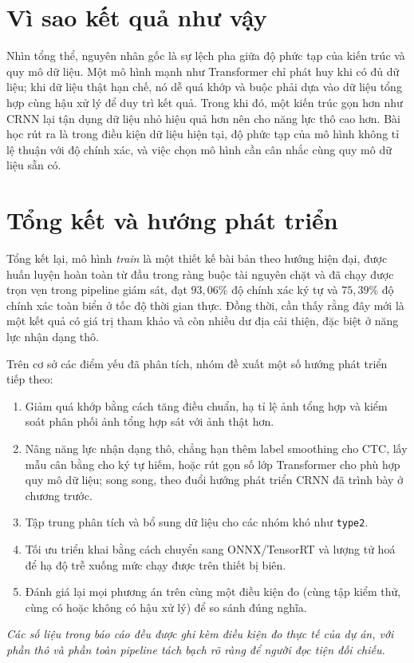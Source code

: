 \documentclass[12pt,a4paper]{report}
\begin{document}
\section{Vì sao kết quả như vậy}
Nhìn tổng thể, nguyên nhân gốc là sự lệch pha giữa độ phức tạp của kiến trúc và quy mô dữ liệu. Một mô hình mạnh như Transformer chỉ phát huy khi có đủ dữ liệu; khi dữ liệu thật hạn chế, nó dễ quá khớp và buộc phải dựa vào dữ liệu tổng hợp cùng hậu xử lý để duy trì kết quả. Trong khi đó, một kiến trúc gọn hơn như CRNN lại tận dụng dữ liệu nhỏ hiệu quả hơn nên cho năng lực thô cao hơn. Bài học rút ra là trong điều kiện dữ liệu hiện tại, độ phức tạp của mô hình không tỉ lệ thuận với độ chính xác, và việc chọn mô hình cần cân nhắc cùng quy mô dữ liệu sẵn có.

\section{Tổng kết và hướng phát triển}
Tổng kết lại, mô hình \emph{train} là một thiết kế bài bản theo hướng hiện đại, được huấn luyện hoàn toàn từ đầu trong ràng buộc tài nguyên chặt và đã chạy được trọn vẹn trong pipeline giám sát, đạt $93{,}06\%$ độ chính xác ký tự và $75{,}39\%$ độ chính xác toàn biển ở tốc độ thời gian thực. Đồng thời, cần thấy rằng đây mới là một kết quả có giá trị tham khảo và còn nhiều dư địa cải thiện, đặc biệt ở năng lực nhận dạng thô.

Trên cơ sở các điểm yếu đã phân tích, nhóm đề xuất một số hướng phát triển tiếp theo:
\begin{enumerate}[leftmargin=*]
  \item Giảm quá khớp bằng cách tăng điều chuẩn, hạ tỉ lệ ảnh tổng hợp và kiểm soát phân phối ảnh tổng hợp sát với ảnh thật hơn.
  \item Nâng năng lực nhận dạng thô, chẳng hạn thêm label smoothing cho CTC, lấy mẫu cân bằng cho ký tự hiếm, hoặc rút gọn số lớp Transformer cho phù hợp quy mô dữ liệu; song song, theo đuổi hướng phát triển CRNN đã trình bày ở chương trước.
  \item Tập trung phân tích và bổ sung dữ liệu cho các nhóm khó như \texttt{type2}.
  \item Tối ưu triển khai bằng cách chuyển sang ONNX/TensorRT và lượng tử hoá để hạ độ trễ xuống mức chạy được trên thiết bị biên.
  \item Đánh giá lại mọi phương án trên cùng một điều kiện đo (cùng tập kiểm thử, cùng có hoặc không có hậu xử lý) để so sánh đúng nghĩa.
\end{enumerate}

\vfill
\begin{center}\small\itshape
Các số liệu trong báo cáo đều được ghi kèm điều kiện đo thực tế của dự án, với phần thô và phần toàn pipeline tách bạch rõ ràng để người đọc tiện đối chiếu.
\end{center}
\end{document}
